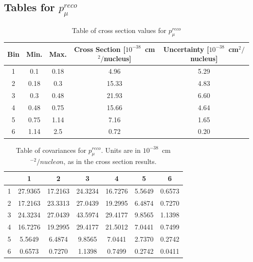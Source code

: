 \FloatBarrier\subsection{Tables for $p_{\mu}^{reco}$} 
\begin{table}[ht] 
\begin{tabular}{|c|c|c|c|c|} \hline 
Bin & Min. & Max. & Cross Section [$10^{-38}$~cm$^{2}/$nucleus] & Uncertainty [$10^{-38}$~cm$^{2}/$nucleus] \\ \hline 
1 & 0.1 & 0.18 & 4.96 & 5.29 \\ \hline 
2 & 0.18 & 0.3 & 15.33 & 4.83 \\ \hline 
3 & 0.3 & 0.48 & 21.93 & 6.60 \\ \hline 
4 & 0.48 & 0.75 & 15.66 & 4.64 \\ \hline 
5 & 0.75 & 1.14 & 7.16 & 1.65 \\ \hline 
6 & 1.14 & 2.5 & 0.72 & 0.20 \\ \hline 
\end{tabular} 
\caption{Table of cross section values for $p_{\mu}^{reco}$} 
\end{table} 
 
 
\begin{table}[ht] 
\begin{tabular}{|c|c|c|c|c|c|c|} \hline 
\ & 1 & 2 & 3 & 4 & 5 & 6 \\ \hline 
1 & 27.9365 & 17.2163 & 24.3234 & 16.7276 & 5.5649 & 0.6573 \\ \hline 
2 & 17.2163 & 23.3313 & 27.0439 & 19.2995 & 6.4874 & 0.7270 \\ \hline 
3 & 24.3234 & 27.0439 & 43.5974 & 29.4177 & 9.8565 & 1.1398 \\ \hline 
4 & 16.7276 & 19.2995 & 29.4177 & 21.5012 & 7.0441 & 0.7499 \\ \hline 
5 & 5.5649 & 6.4874 & 9.8565 & 7.0441 & 2.7370 & 0.2742 \\ \hline 
6 & 0.6573 & 0.7270 & 1.1398 & 0.7499 & 0.2742 & 0.0411 \\ \hline 
\end{tabular} 
\caption{Table of covariances for $p_{\mu}^{reco}$. 
Units are in $10^{-38}$~cm$^{-2}/nucleon$, as in the cross section results.}
\end{table} 
 
